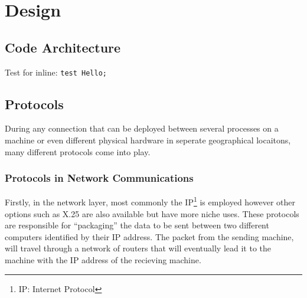 \chapter{Design}

\section{Code Architecture}

Test for inline: \lstinline{test Hello;}

\section{Protocols}
During any connection that can be deployed between several processes on a machine or even different physical hardware in seperate geographical locaitons, many different protocols come into play.

\subsection{Protocols in Network Communications}
Firstly, in the network layer, most commonly the IP\footnote{IP: Internet Protocol} is employed however other options such as X.25 are also available but have more niche uses. These protocols are responsible for ``packaging'' the data to be sent between two different computers identified by their IP address. The packet from the sending machine, will travel through a network of routers that will eventually lead it to the machine with the IP address of the recieving machine.

